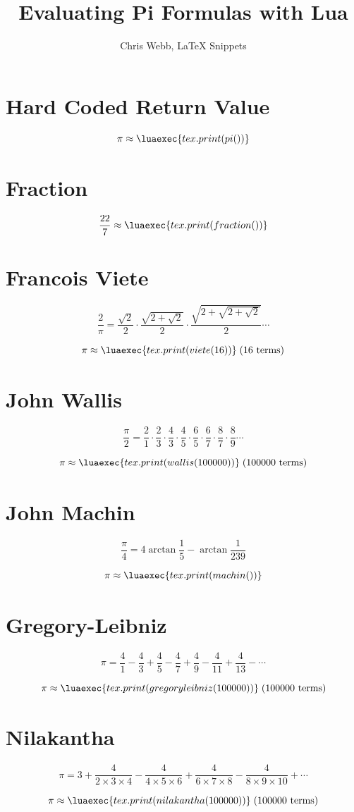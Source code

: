 \documentclass{article}
\title{Evaluating Pi Formulas with Lua}
\author{Chris Webb, LaTeX Snippets}
\date{}
\begin{document}
\maketitle


\section{Hard Coded Return Value}


\[
\pi \approx 
\luaexec{tex.print(pi())}
\]


\section{Fraction}

\[
\frac{22}{7} \approx 
\luaexec{tex.print(fraction())}
\]


\section{Francois Viete}

\[
\frac{2}{\pi} = 
\frac{\sqrt{2}}{2} \cdot 
\frac{\sqrt{2+\sqrt{2}}}{2} \cdot
\frac{\sqrt{2+\sqrt{2+\sqrt{2}}}}{2} 
\cdots
\]

\[
\pi \approx 
\luaexec{tex.print(viete(16))}
\;\text{(16 terms)}
\]


\section{John Wallis}

\[
\frac{\pi}{2} = 
\frac{2}{1} \cdot
\frac{2}{3} \cdot
\frac{4}{3} \cdot
\frac{4}{5} \cdot
\frac{6}{5} \cdot
\frac{6}{7} \cdot
\frac{8}{7} \cdot
\frac{8}{9}
\cdots
\]

\[
\pi \approx 
\luaexec{tex.print(wallis(100000))}
\;\text{(100000 terms)}
\]


\section{John Machin}

\[
\frac{\pi}{4} = 4 \arctan \frac{1}{5} - \arctan \frac{1}{239}
\]

\[
\pi \approx 
\luaexec{tex.print(machin())}
\]


\section{Gregory-Leibniz}

\[
\pi = 
\frac{4}{1} -
\frac{4}{3} +
\frac{4}{5} -
\frac{4}{7} +
\frac{4}{9} -
\frac{4}{11} +
\frac{4}{13} -
\cdots
\]

\[
\pi \approx 
\luaexec{tex.print(gregoryleibniz(100000))}
\;\text{(100000 terms)}
\]


\section{Nilakantha}

\[
\pi = 3 +
\frac{4}{2 \times 3 \times 4} -
\frac{4}{4 \times 5 \times 6} +
\frac{4}{6 \times 7 \times 8} -
\frac{4}{8 \times 9 \times 10} +
\cdots
\]

\[
\pi \approx 
\luaexec{tex.print(nilakantha(100000))}
\;\text{(100000 terms)}
\]
\end{document}
